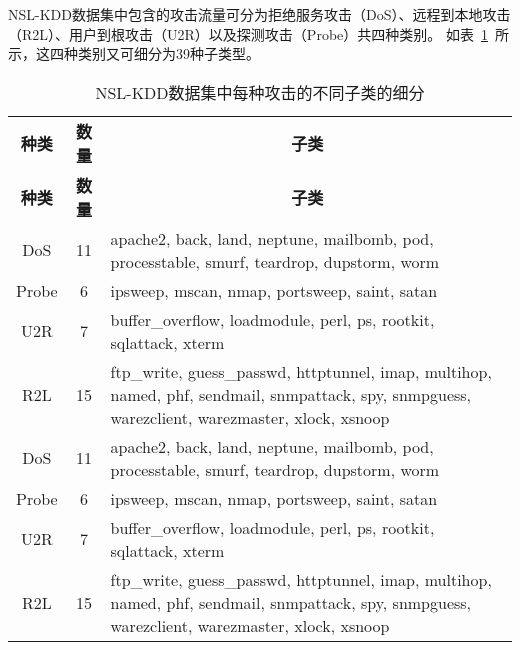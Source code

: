 NSL-KDD数据集中包含的攻击流量可分为拒绝服务攻击（DoS）、远程到本地攻击（R2L）、用户到根攻击（U2R）以及探测攻击（Probe）共四种类别。
如表~\ref{tab:attack_class}~所示，这四种类别又可细分为39种子类型。
\begin{table}[h]
	\caption{NSL-KDD数据集中每种攻击的不同子类的细分}
	\label{tab:attack_class}
	\begin{tabularx}{\textwidth}{@{}ccX@{}}
		\toprule
		\multicolumn{1}{c}{\textbf{种类}} & \multicolumn{1}{c}{\textbf{数量}} & \multicolumn{1}{c}{\textbf{子类}}                                                                                                                \\
		\multicolumn{1}{c}{\textbf{种类}} & \multicolumn{1}{c}{\textbf{数量}} & \multicolumn{1}{c}{\textbf{子类}}                                                                                                                \\
		\midrule
		DoS                               & 11                                & apache2, back, land, neptune, mailbomb, pod, processtable, smurf, teardrop, dupstorm, worm                                                       \\
		Probe                             & 6                                 & ipsweep, mscan, nmap, portsweep, saint, satan                                                                                                    \\
		U2R                               & 7                                 & buffer\_overflow, loadmodule, perl, ps, rootkit, sqlattack, xterm                                                                                \\
		R2L                               & 15                                & ftp\_write, guess\_passwd, httptunnel, imap, multihop, named, phf, sendmail, snmpattack, spy, snmpguess, warezclient, warezmaster, xlock, xsnoop \\
		DoS                               & 11                                & apache2, back, land, neptune, mailbomb, pod, processtable, smurf, teardrop, dupstorm, worm                                                       \\
		Probe                             & 6                                 & ipsweep, mscan, nmap, portsweep, saint, satan                                                                                                    \\
		U2R                               & 7                                 & buffer\_overflow, loadmodule, perl, ps, rootkit, sqlattack, xterm                                                                                \\
		R2L                               & 15                                & ftp\_write, guess\_passwd, httptunnel, imap, multihop, named, phf, sendmail, snmpattack, spy, snmpguess, warezclient, warezmaster, xlock, xsnoop \\
		\bottomrule
	\end{tabularx}
\end{table}

